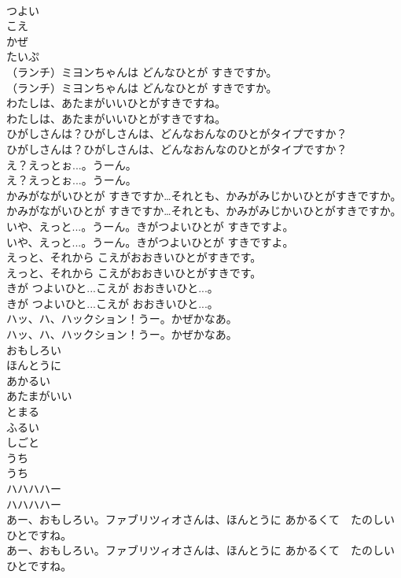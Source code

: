 \documentclass[8pt]{extreport}
\begin{document}
\begin{CJK}{UTF8}{min}
\\	つよい
\\	こえ
\\	かぜ
\\	たいぷ
\\	（ランチ）ミヨンちゃんは どんなひとが すきですか。	
\\	（ランチ）ミヨンちゃんは どんなひとが すきですか。 
\\	わたしは、あたまがいいひとがすきですね。	
\\	わたしは、あたまがいいひとがすきですね。 
\\	ひがしさんは？ひがしさんは、どんなおんなのひとがタイプですか？	
\\	ひがしさんは？ひがしさんは、どんなおんなのひとがタイプですか？ 
\\	え？えっとぉ...。うーん。	
\\	え？えっとぉ...。うーん。 
\\	かみがながいひとが すきですか…それとも、かみがみじかいひとがすきですか。	
\\	かみがながいひとが すきですか…それとも、かみがみじかいひとがすきですか。 
\\	いや、えっと...。うーん。きがつよいひとが すきですよ。	
\\	いや、えっと...。うーん。きがつよいひとが すきですよ。 
\\	えっと、それから こえがおおきいひとがすきです。	
\\	えっと、それから こえがおおきいひとがすきです。 
\\	きが つよいひと...こえが おおきいひと...。	
\\	きが つよいひと...こえが おおきいひと...。 
\\	ハッ、ハ、ハックション！うー。かぜかなあ。	
\\	ハッ、ハ、ハックション！うー。かぜかなあ。 
\\	おもしろい
\\	ほんとうに
\\	あかるい
\\	あたまがいい
\\	とまる
\\	ふるい
\\	しごと
\\	うち
\\	うち
\\	ハハハハー	
\\	ハハハハー 
\\	あー、おもしろい。ファブリツィオさんは、ほんとうに あかるくて　たのしいひとですね。	
\\	あー、おもしろい。ファブリツィオさんは、ほんとうに あかるくて　たのしいひとですね。 

\end{CJK}
\end{document}
